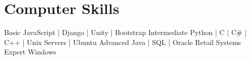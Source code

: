\documentclass[]{twentysecondcv}
\begin{document}
\section{Computer Skills}

\begin{twentyshort}
  \twentyitemshort
    {Basic}
    {   JavaScript | Django | Unity | Bootstrap}
  \twentyitemshort
    {Intermediate}
    {   Python | C | C\# | C++ | Unix Servers | Ubuntu}
  \twentyitemshort
    {Advanced}
    {   Java | SQL | Oracle Retail Systems}
  \twentyitemshort
    {Expert}
    {   Windows}
\end{twentyshort}


\end{document}
